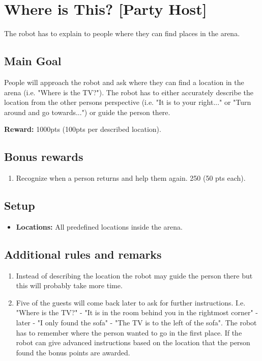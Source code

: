 \section{Where is This? [Party Host]}
The robot has to explain to people where they can find places in the arena.


\subsection{Main Goal}
People will approach the robot and ask where they can find a location in the arena (i.e. "Where is the TV?"). The robot has to either accurately describe the location from the other persons perspective (i.e. "It is to your right..." or "Turn around and go towards...") or guide the person there.

\noindent\textbf{Reward:} 1000pts (100pts per described location).

\subsection{Bonus rewards}
\begin{enumerate}[nosep]
	\item Recognize when a person returns and help them again. 250 (50 pts each).
\end{enumerate}

\subsection{Setup}
\begin{itemize}[nosep]
	\item \textbf{Locations:} All predefined locations inside the arena.
\end{itemize}

\subsection{Additional rules and remarks}
\begin{enumerate}[nosep]
	 \item Instead of describing the location the robot may guide the person there but this will probably take more time.
	 \item Five of the guests will come back later to ask for further instructions. I.e. "Where is the TV?" - "It is in the room behind you in the rightmost corner" - later - "I only found the sofa" - "The TV is to the left of the sofa". The robot has to remember where the person wanted to go in the first place. If the robot can give advanced instructions based on the location that the person found the bonus points are awarded.
\end{enumerate}

